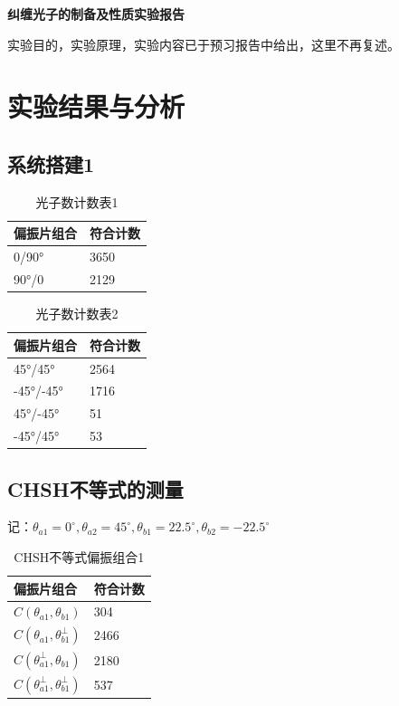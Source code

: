\documentclass[a4paper,UTF8]{ctexart}
\begin{document}
\begin{center}
    \textbf{\Large 纠缠光子的制备及性质实验报告}
    \par {}
\end{center}

实验目的，实验原理，实验内容已于预习报告中给出，这里不再复述。

\section{实验结果与分析}

\subsection{系统搭建1}

\begin{table}[H]
    \centering
    \caption{光子数计数表1}
    \begin{tabular}{|l|l|}
    \hline
        \textbf{偏振片组合} & \textbf{符合计数} \\ \hline
        0/90° & 3650 \\ \hline
        90°/0 & 2129 \\ \hline
    \end{tabular}
\end{table}

\begin{table}[H]
    \centering
    \caption{光子数计数表2}
    \begin{tabular}{|l|l|}
    \hline
        \textbf{偏振片组合} & \textbf{符合计数} \\ \hline
        45°/45° & 2564 \\ \hline
        -45°/-45° & 1716 \\ \hline
        45°/-45° & 51 \\ \hline
        -45°/45° & 53 \\ \hline
    \end{tabular}
\end{table}

\subsection{CHSH不等式的测量}

记：$\theta_{a1} = 0^{\circ},\theta_{a2} = 45^{\circ},\theta_{b1} = 22.5^{\circ},\theta_{b2} = -22.5^{\circ}$

\begin{table}[H]
    \centering
    \caption{CHSH不等式偏振组合1}
    \begin{tabular}{|l|l|}
    \hline
        \textbf{偏振片组合} & \textbf{符合计数} \\ \hline
        $C(\theta_{a1},\theta_{b1})$ & 304 \\ \hline
        $C(\theta_{a1},\theta_{b1}^{\bot})$ & 2466 \\ \hline
        $C(\theta_{a1}^{\bot},\theta_{b1})$ & 2180 \\ \hline
        $C(\theta_{a1}^{\bot},\theta_{b1}^{\bot})$ & 537 \\ \hline
    \end{tabular}
\end{table}
\end{document}
